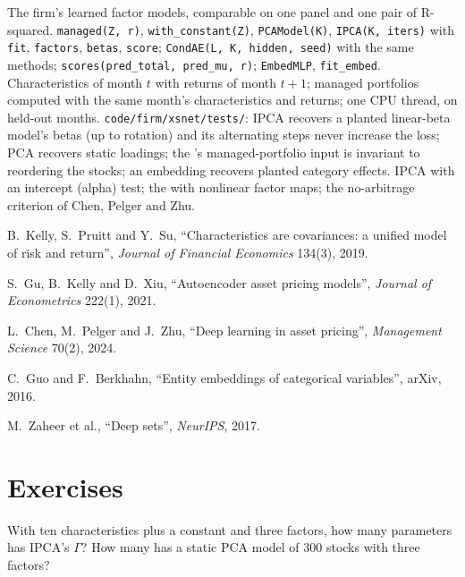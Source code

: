 \begin{build}
 The firm's learned factor models, comparable on one panel and one pair of R-squared.
 \texttt{managed(Z, r)}, \texttt{with\_constant(Z)}, \texttt{PCAModel(K)}, \texttt{IPCA(K, iters)}
with \texttt{fit}, \texttt{factors}, \texttt{betas}, \texttt{score}; \texttt{CondAE(L, K, hidden, seed)} with the same
methods; \texttt{scores(pred\_total, pred\_mu, r)}; \texttt{EmbedMLP}, \texttt{fit\_embed}.
 Characteristics of month $t$ with returns of month $t+1$; managed portfolios computed with the same month's
characteristics and returns; one CPU thread,  on held-out months.
 \texttt{code/firm/xsnet/tests/}: IPCA recovers a planted linear-beta model's betas (up to rotation)
and its alternating steps never increase the loss; PCA recovers static loadings; the 's managed-portfolio
input is invariant to reordering the stocks; an embedding recovers planted category effects.
 IPCA with an intercept (alpha) test; the  with nonlinear factor maps; the no-arbitrage
criterion of Chen, Pelger and Zhu.
\end{build}

\begin{omsources}
\item B.~Kelly, S.~Pruitt and Y.~Su, ``Characteristics are covariances: a unified model of risk and return'', \emph{Journal
of Financial Economics} 134(3), 2019.
\item S.~Gu, B.~Kelly and D.~Xiu, ``Autoencoder asset pricing models'', \emph{Journal of Econometrics} 222(1), 2021.
\item L.~Chen, M.~Pelger and J.~Zhu, ``Deep learning in asset pricing'', \emph{Management Science} 70(2), 2024.
\item C.~Guo and F.~Berkhahn, ``Entity embeddings of categorical variables'', arXiv, 2016.
\item M.~Zaheer et al., ``Deep sets'', \emph{NeurIPS}, 2017.
\end{omsources}

\section{Exercises}

\begin{exercise}[$\star$]\label{exo:ml:cross-sectional-deep-models:1}
With ten characteristics plus a constant and three factors, how many parameters has IPCA's $\Gamma$? How many has a static
PCA model of 300 stocks with three factors?
\end{exercise}

